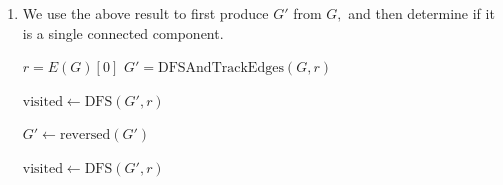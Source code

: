 \documentclass[12pt]{article}
\begin{document}
\begin{enumerate}
\begin{enumerate}
        Let $G_d$ be the undirected graph produced by the deletion of
        $\{u, v\}$ in $G.$ By definition, every pair of vertices $a,
        b$ have some path $a \to b.$ Now consider $G_d,$ and for
        every pair of vertices $a, b$, construct the path by
        replacing every occurrence $(u, v)$ or $(v, u)$ with the
        undirected path from $v$ to $u$ (or flipped as required).
        Since such a $u \to v$ path always exist, we can always form
        a path from $a$ to $b$ for an arbitrary selection of $a, b$
        meaning $G_d$ is still connected. Hence, $G$ is $2$-connected.

      \item We use the above result to first produce $G'$ from $G,$
        and then determine if it is a single connected component.

        \begin{algorithm}
          \caption{Is $G$ $2$-connected?}
          \begin{algorithmic}
            \State $r = E(G)[0]$  
            \State $G' = \text{DFSAndTrackEdges}(G, r)$

            \vspace{3mm}
            \State $\text{visited} \gets\text{DFS}(G', r)$
            \State{}
            \EndIf

            $G' \gets \text{reversed}(G')$ 

            \vspace{3mm}
            \State $\text{visited} \gets\text{DFS}(G', r)$
            \State{}
            \EndIf

            \vspace{3mm}

            \State {} 
            \EndProcedure
          \end{algorithmic}
        \end{algorithm}
    \end{enumerate}
\end{enumerate}
\end{document}

